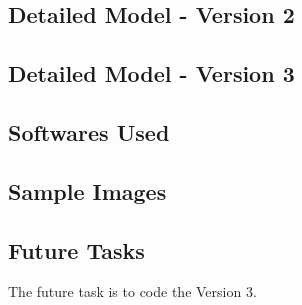 \documentclass[../../main.tex]{subfiles}
\begin{document}
\subsection{Detailed Model - Version 2 \label{subsection:v2}}






\subsection{Detailed Model - Version 3 \label{subsection:v3}}




\subsection{Softwares Used}





\subsection{Sample Images}
\blindtext



\subsection{Future Tasks}
The future task is to code the Version 3. 

\printbibliography
\end{document}
